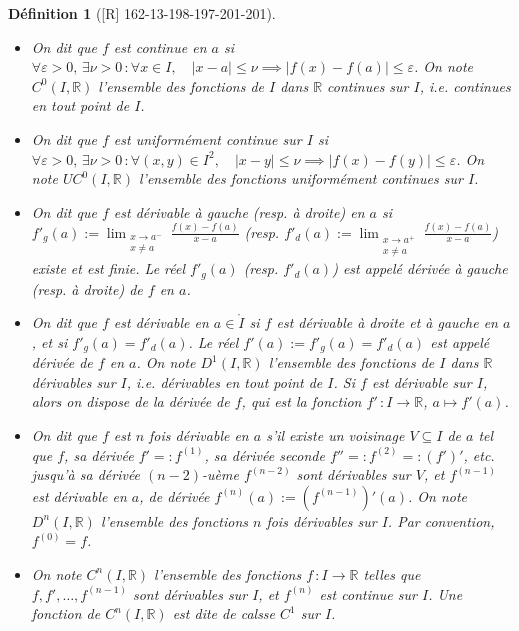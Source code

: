 \documentclass[10pt, a4paper, parskip=full, twoside, twocolumn]{report}
\newtheorem{definition}{Définition}
\newcommand{\IR}{\mathbb{R}}
\begin{document}
\begin{definition}[\textnormal{[R] 162-13-198-197-201-201}]
	\begin{itemize}
		\item{On dit que $f$ est \emph{continue en $a$} si $\forall \varepsilon > 0,\,\exists \nu >0\,\colon\forall x\in I,\quad \vert x - a\vert \leq \nu \implies \vert f(x) - f(a) \vert \leq \varepsilon$.
		On note $C^0(I,\IR)$ l'ensemble des fonctions de $I$ dans $\IR$ continues sur $I$, \emph{i.e.} continues en tout point de $I$.}
		
		\item {On dit que $f$ est \emph{uniformément continue sur $I$} si $\forall \varepsilon > 0,\, \exists \nu > 0\,\colon \forall (x,y)\in I^2,\quad \vert x-y\vert \leq \nu \implies \vert f(x)-f(y)\vert \leq \varepsilon$.
		On note $UC^0(I,\IR)$ l'ensemble des fonctions uniformément continues sur $I$.}
		
		\item {On dit que $f$ est \emph{dérivable à gauche} (resp. \emph{à droite}) \emph{en $a$} si 
		$\displaystyle{f'_g(a) := \lim_{\substack{x\to a^- \\ x\neq a}}\frac{f(x)-f(a)}{x-a}}$ (resp. $\displaystyle{f'_d(a) := \lim_{\substack{x\to a^+ \\ x\neq a}}\frac{f(x)-f(a)}{x-a}}$)
		existe et est finie. Le réel $f'_g(a)$ (resp. $f'_d(a)$) est appelé \emph{dérivée à gauche} (resp. \emph{à droite}) \emph{de $f$ en $a$}.}

		\item {On dit que $f$ est \emph{dérivable en $a\in\mathring{I}$} si $f$ est dérivable à droite et à gauche en $a$, et si $f'_g(a)=f'_d(a)$. Le réel $f'(a):= f'_g(a)=f'_d(a)$ est appelé \emph{dérivée de $f$ en $a$}. 
		On note $D^1(I,\IR)$ l'ensemble des fonctions de $I$ dans $\IR$ \emph{dérivables sur $I$}, \emph{i.e.} dérivables en tout point de $I$. Si $f$ est dérivable sur $I$, alors on dispose de la \emph{dérivée de $f$}, qui est la fonction $f'\,\colon I\to \IR$, $a\mapsto f'(a)$.}

		\item {On dit que $f$ est \emph{$n$ fois dérivable en $a$} s'il existe un voisinage $V\subseteq I$ de $a$ tel que $f$, sa dérivée $f' =: f^{(1)}$, sa dérivée seconde $f'' =: f^{(2)} =: (f')'$, etc. jusqu'à sa dérivée $(n-2)$-uème $f^{(n-2)}$ sont dérivables sur $V$, et $f^{(n-1)}$ est dérivable en $a$, de dérivée $f^{(n)}(a) := (f^{(n-1)})'(a)$. 
		On note $D^n(I,\IR)$ l'ensemble des fonctions $n$ fois dérivables sur $I$. Par convention, $f^{(0)} = f$.}

		\item {On note $C^n(I,\IR)$ l'ensemble des fonctions $f\,\colon I\to \IR$ telles que $f, f', \dots, f^{(n-1)}$ sont dérivables sur $I$, et $f^{(n)}$ est continue sur $I$. Une fonction de $C^n(I,\IR)$ est dite de \emph{calsse $C^1$ sur $I$}.}
	\end{itemize}
\end{definition}
\end{document}
